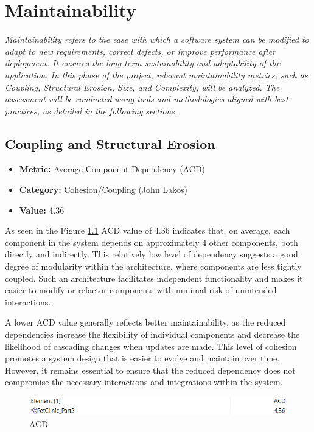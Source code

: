 \documentclass[a4paper,11pt,openright,BCOR=15mm]{scrbook}
\begin{document}
\chapter{Maintainability}
\textit{	Maintainability refers to the ease with which a software system can be modified to adapt to new requirements, correct defects, or improve performance after deployment. It ensures the long-term sustainability and adaptability of the application. In this phase of the project, relevant maintainability metrics, such as Coupling, Structural Erosion, Size, and Complexity, will be analyzed. The assessment will be conducted using tools and methodologies aligned with best practices, as detailed in the following sections.}
\section{Coupling and Structural Erosion}
\begin{itemize}
    \item \textbf{Metric:} Average Component Dependency (ACD)
    \item \textbf{Category:} Cohesion/Coupling (John Lakos)
    \item \textbf{Value:} 4.36
\end{itemize}
As seen in the Figure \ref{fig:ACD} ACD value of 4.36 indicates that, on average, each component in the system depends on approximately 4 other components, both directly and indirectly. This relatively low level of dependency suggests a good degree of modularity within the architecture, where components are less tightly coupled. Such an architecture facilitates independent functionality and makes it easier to modify or refactor components with minimal risk of unintended interactions.

A lower ACD value generally reflects better maintainability, as the reduced dependencies increase the flexibility of individual components and decrease the likelihood of cascading changes when updates are made. This level of cohesion promotes a system design that is easier to evolve and maintain over time. However, it remains essential to ensure that the reduced dependency does not compromise the necessary interactions and integrations within the system.
\begin{figure}[H]
	\centering
	\includegraphics[width=\textwidth]{figs/Maintainability/ACD.png}
	\caption{ACD}
	\label{fig:ACD}
\end{figure}
\end{document}
